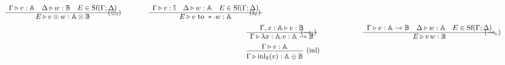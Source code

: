 \begin{figure} [H]
{\begin{equation*}
\begin{split}
\begin{aligned}
\begin{minipage}[t]{0.3\textwidth}
$\begin{array}{c}
     \Gamma \triangleright v: \mathbb{A} \quad  \Delta \triangleright w: \mathbb{B}  \quad E \in \text{Sf}(\Gamma;\Delta) \\
    \hline
   E \triangleright v \otimes w: \mathbb{A} \otimes \mathbb{B} 
\end{array}
$
\end{minipage}
\hspace{41pt} (\otimes_{i}) 
 \hspace{39pt}
 \begin{minipage}[t]{0.3\textwidth}
$\begin{array}{c}
     \Gamma \triangleright v: \mathbb{I} \quad  \Delta \triangleright w: \mathbb{A}  \quad E \in \text{Sf}(\Gamma;\Delta)  \\
    \hline
   E \triangleright v \text { to } *.w: \mathbb{A}  
\end{array}
$ \end{minipage}
\hspace{38pt} (\mathbb{I}_{e}) \\
& \hspace{-20pt}
\begin{minipage}[t]{0.3\textwidth}
$\begin{array}{c}
     \Gamma,x:\mathbb{A} \triangleright v: \mathbb{B} \\
    \hline
   \Gamma \triangleright \lambda x:\mathbb{A} . v: \mathbb{A} \multimap \mathbb{B} 
\end{array}
$
\end{minipage}
\hspace{-27pt} (\multimap_{i}) 
 \hspace{66pt}
 \begin{minipage}[t]{0.3\textwidth}
$\begin{array}{c}
     \Gamma \triangleright v: \mathbb{A} \multimap \mathbb{B} \quad  \Delta \triangleright w: \mathbb{A}  \quad E \in \text{Sf}(\Gamma;\Delta)  \\
    \hline
   E \triangleright v \, w: \mathbb{B}  
\end{array}
$ \end{minipage}
\hspace{67pt} (\multimap_{e}) \\
& \hspace{-20pt}
    \begin{prooftree}
        \hypo{\Gamma \vljud v: \typeA}
        \infer1[(inl)]{\Gamma \vljud \inl_{\typeB}(v): \typeA \oplus \typeB}

\end{prooftree}
\end{aligned}
\end{split}
\end{equation*}}
\end{figure}

